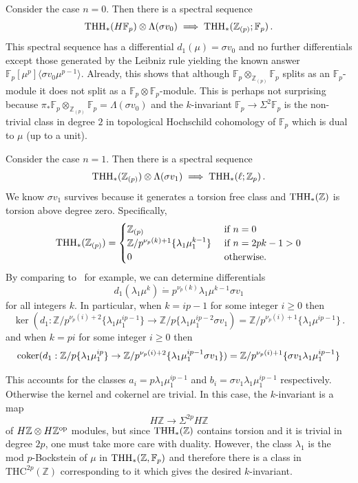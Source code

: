 \begin{example}
Consider the case $n=0$. Then there is a spectral sequence 
\[ 
\operatorname{THH}_{*}(H\mathbb{F}_{p})\otimes \Lambda (\sigma v_{0})\implies \operatorname{THH}_{*}(\mathbb{Z}_{(p)};\mathbb{F}_{p}) \,.
\]
This spectral sequence has a differential $d_{1}(\mu)=\sigma v_{0}$ and no further differentials except those generated by the Leibniz rule yielding the known answer $\mathbb{F}_p[\mu^p]\langle \sigma v_0 \mu^{p-1}\rangle$. 
Already, this shows that although $\mathbb{F}_p\otimes_{\mathbb{Z}_{(p)}}\mathbb{F}_p$ splits as an $\mathbb{F}_p$-module it does not split as a $\mathbb{F}_p\otimes \mathbb{F}_p$-module. This is perhaps not surprising because $\pi_*\mathbb{F}_p\otimes_{\mathbb{Z}_{(p)}}\mathbb{F}_p=\Lambda (\sigma v_0)$ and the $k$-invariant $\mathbb{F}_p\to \Sigma^{2}\mathbb{F}_p$ is the non-trivial class in degree $2$ in topological Hochschild cohomology of $\mathbb{F}_p$ which is dual to $\mu$ (up to a unit).
\end{example}

\begin{example}
Consider the case $n=1$. Then there is a spectral sequence 
\[ 
\operatorname{THH}_{*}(\mathbb{Z}_{(p)})\otimes \Lambda (\sigma v_{1})\implies \operatorname{THH}_{*}(\ell;\mathbb{Z}_{p}) \,.
\]
We know $\sigma v_1$ survives because it generates a torsion free class and $\operatorname{THH}_*(\mathbb{Z})$ is torsion above degree zero. Specifically, 
\[
\operatorname{THH}_*(\mathbb{Z}_{(p)})=\begin{cases} \mathbb{Z}_{(p)} & \text{ if } n=0 \\ 
\mathbb{Z}/p^{\nu_p(k)+1}\{\lambda_1\mu_1^{k-1}\} & \text{ if } n=2pk-1>0 \\ 
0 & \text{ otherwise.}
\end{cases}
\]
By comparing to~\cite{AHL10} for example, we can determine differentials 
\[
d_1(\lambda_1\mu^{k})\dot{=}p^{\nu_p(k)}\lambda_1\mu^{k-1}\sigma v_1 
\]
for all integers $k$. 
In particular, when $k=ip-1$ for some integer $i\ge 0$ then 
\[ 
\ker
(d_1 :\mathbb{Z}/p^{\nu_p(i)+2}\{\lambda_1\mu_1^{ip-1}\}\to \mathbb{Z}/p\{\lambda_1\mu_1^{ip-2}\sigma v_1) = \mathbb{Z}/p^{\nu_p(i)+1}\{\lambda_1\mu^{ip-1}\} \,.
\]
and when $k=pi$ for some integer $i\ge 0$ then 
\[ 
\textup{coker} 
(d_1 :\mathbb{Z}/p\{\lambda_1\mu_1^{ip}\}\to \mathbb{Z}/p^{\nu_p(i)+2}\{\lambda_1 \mu_1^{ip-1}\sigma v_1 \}) = \mathbb{Z}/p^{\nu_p(i)+1}\{\sigma v_1\lambda_1\mu_1^{ip-1}\}
\]

This accounts for the classes $a_i=p\lambda_1\mu_1^{ip-1}$ and $b_i=\sigma v_1\lambda_1\mu_1^{ip-1}$ respectively. Otherwise the kernel and cokernel are trivial. In this case, the $k$-invariant is a map 
\[ H\mathbb{Z}\to \Sigma^{2p} H\mathbb{Z}\]
of $ H\mathbb{Z}\otimes H\mathbb{Z}^{\mathrm{op}}$ modules, but since $\operatorname{THH}_*(\mathbb{Z})$ contains torsion and it is trivial in degree $2p$, one must take more care with duality. However, the class $\lambda_1$ is the mod $p$-Bockstein of $\mu$ in $\operatorname{THH}_*(\mathbb{Z},\mathbb{F}_p)$ and therefore there is a class in $\mathrm{THC}^{2p}(\mathbb{Z})$ corresponding to it which gives the desired $k$-invariant. 
\end{example}

